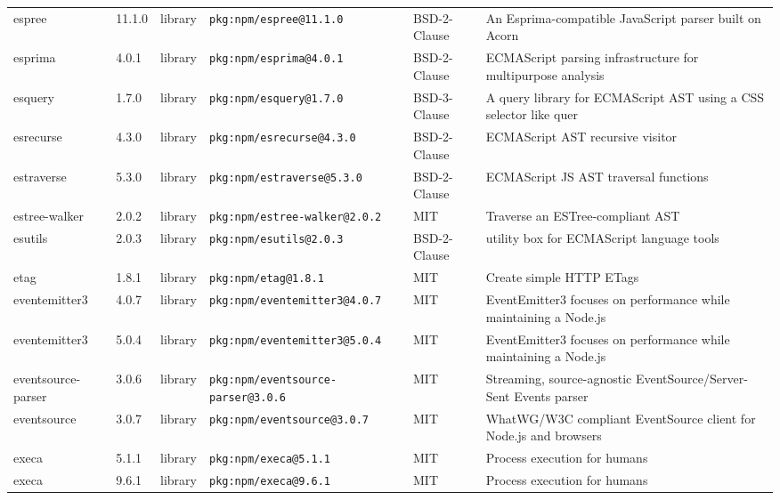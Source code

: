 \documentclass[11pt,a4paper]{article}
\begin{document}
\begin{longtable}{|p{4cm}|p{2cm}|p{1.6cm}|p{5cm}|p{1.5cm}|p{3.5cm}|}
\raggedright espree & 11.1.0 & library & \small\texttt{pkg:npm/espree@11.1.0} & BSD-2-Clause & \small An Esprima-compatible JavaScript parser built on Acorn \\
\raggedright esprima & 4.0.1 & library & \small\texttt{pkg:npm/esprima@4.0.1} & BSD-2-Clause & \small ECMAScript parsing infrastructure for multipurpose analysis \\
\raggedright esquery & 1.7.0 & library & \small\texttt{pkg:npm/esquery@1.7.0} & BSD-3-Clause & \small A query library for ECMAScript AST using a CSS selector like quer \\
\raggedright esrecurse & 4.3.0 & library & \small\texttt{pkg:npm/esrecurse@4.3.0} & BSD-2-Clause & \small ECMAScript AST recursive visitor \\
\raggedright estraverse & 5.3.0 & library & \small\texttt{pkg:npm/estraverse@5.3.0} & BSD-2-Clause & \small ECMAScript JS AST traversal functions \\
\raggedright estree-walker & 2.0.2 & library & \small\texttt{pkg:npm/estree-walker@2.0.2} & MIT & \small Traverse an ESTree-compliant AST \\
\raggedright esutils & 2.0.3 & library & \small\texttt{pkg:npm/esutils@2.0.3} & BSD-2-Clause & \small utility box for ECMAScript language tools \\
\raggedright etag & 1.8.1 & library & \small\texttt{pkg:npm/etag@1.8.1} & MIT & \small Create simple HTTP ETags \\
\raggedright eventemitter3 & 4.0.7 & library & \small\texttt{pkg:npm/eventemitter3@4.0.7} & MIT & \small EventEmitter3 focuses on performance while maintaining a Node.js  \\
\raggedright eventemitter3 & 5.0.4 & library & \small\texttt{pkg:npm/eventemitter3@5.0.4} & MIT & \small EventEmitter3 focuses on performance while maintaining a Node.js  \\
\raggedright eventsource-parser & 3.0.6 & library & \small\texttt{pkg:npm/eventsource-parser@3.0.6} & MIT & \small Streaming, source-agnostic EventSource/Server-Sent Events parser \\
\raggedright eventsource & 3.0.7 & library & \small\texttt{pkg:npm/eventsource@3.0.7} & MIT & \small WhatWG/W3C compliant EventSource client for Node.js and browsers \\
\raggedright execa & 5.1.1 & library & \small\texttt{pkg:npm/execa@5.1.1} & MIT & \small Process execution for humans \\
\raggedright execa & 9.6.1 & library & \small\texttt{pkg:npm/execa@9.6.1} & MIT & \small Process execution for humans \\

\end{longtable}
\end{document}
